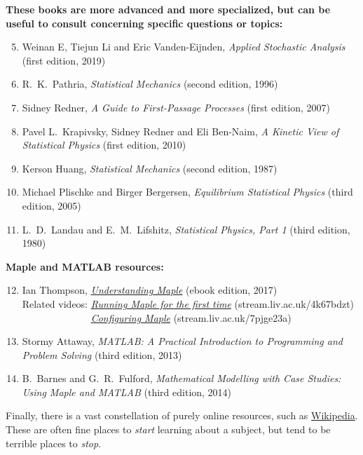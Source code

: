 \documentclass[12 pt]{article}
\begin{document}
\noindent\textbf{These books are more advanced and more specialized, but can be useful to consult concerning specific questions or topics:} \\[-24 pt]
\begin{enumerate}
  \setcounter{enumi}{4}
  \item Weinan E, Tiejun Li and Eric Vanden-Eijnden, \textit{Applied Stochastic Analysis} (first edition, 2019)
  \item R.~K.~Pathria, \textit{Statistical Mechanics} (second edition, 1996)
  \item Sidney Redner, \textit{A Guide to First-Passage Processes} (first edition, 2007)
  \item Pavel L.~Krapivsky, Sidney Redner and Eli Ben-Naim, \textit{A Kinetic View of Statistical Physics} (first edition, 2010)
  \item Kerson Huang, \textit{Statistical Mechanics} (second edition, 1987)
  \item Michael Plischke and Birger Bergersen, \textit{Equilibrium Statistical Physics} (third edition, 2005)
  \item L.~D.~Landau and E.~M.~Lifshitz, \textit{Statistical Physics, Part 1} (third edition, 1980)
\end{enumerate}

\noindent\textbf{Maple and MATLAB resources:} \\[-24 pt]
\begin{enumerate}
  \setcounter{enumi}{11}
  \item Ian Thompson, \href{https://library.liv.ac.uk/record=b4395758~S8}{\textit{Understanding Maple}} (ebook edition, 2017) \\
        Related videos: \href{https://stream.liv.ac.uk/4k67bdzt}{\textit{Running Maple for the first time}} (stream.liv.ac.uk/4k67bdzt) \\
        \textcolor{white}{Related videos:} \href{https://stream.liv.ac.uk/7pjge23a}{\textit{Configuring Maple}} (stream.liv.ac.uk/7pjge23a)
  \item Stormy Attaway, \textit{MATLAB: A Practical Introduction to Programming and Problem Solving} (third edition, 2013)
  \item B.~Barnes and G.~R.~Fulford, \textit{Mathematical Modelling with Case Studies: Using Maple and MATLAB} (third edition, 2014)
\end{enumerate}

Finally, there is a vast constellation of purely online resources, such as \href{https://en.wikipedia.org/wiki/Statistical_physics}{Wikipedia}.
These are often fine places to \emph{start} learning about a subject, but tend to be terrible places to \emph{stop}.
\end{document}

